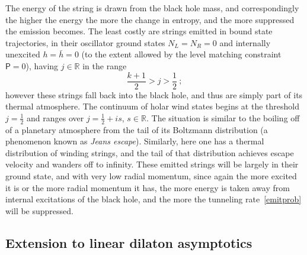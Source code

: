 \documentclass[11pt]{article}
\newcommand{\rcite}{\cite}
\def\sfP{{\mathsf P}}
\def\half{\frac12}
\def\be{\begin{equation}}
\def\ee{\end{equation}}
\newcommand{\bR}{{\mathbb R}}
\numberwithin{equation}{section}
\def\half{\frac12}
\begin{document}
The energy of the string is drawn from the black hole mass, and correspondingly the higher the energy the more the change in entropy, and the more suppressed the emission becomes.  The least costly are strings emitted in bound state trajectories, in their oscillator ground states $N_L= N_R=0$ and internally unexcited $h=\bar h=0$ (to the extent allowed by the level matching constraint $\sfP=0$), having $j\in\bR$ in the range~\rcite{Maldacena:2000hw}
\be
\frac{k+1}{2} > j > \half ~;
\ee
however these strings fall back into the black hole, and thus are simply part of its thermal atmosphere.  The continuum of holar wind states begins at the threshold $j=\half$ and ranges over $j=\half+is$, $s\in\bR$.  The situation is similar to the boiling off of a planetary atmosphere from the tail of its Boltzmann distribution (a phenomenon known as {\it Jeans escape}).  Similarly, here one has a thermal distribution of winding strings, and the tail of that distribution achieves escape velocity and wanders off to infinity.  These emitted strings will be largely in their ground state, and with very low radial momentum, since again the more excited it is or the more radial momentum it has, the more energy is taken away from internal excitations of the black hole, and the more the tunneling rate~\eqref{emitprob} will be suppressed.




\subsection{Extension to linear dilaton asymptotics}
\label{sec:lindil}
\end{document}
